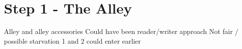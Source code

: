 \section*{Step 1 - The Alley}

Alley and alley accessories
Could have been reader/writer approach
Not fair / possible starvation
1 and 2 could enter earlier

